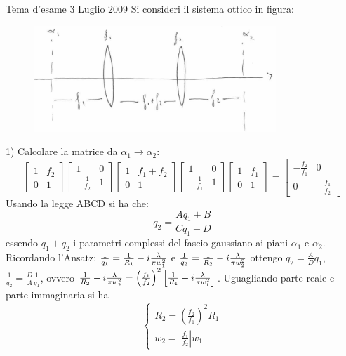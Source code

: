 Tema d'esame 3 Luglio 2009
Si consideri il sistema ottico in figura:
\begin{figure}[H]
\centering
\includegraphics[height=4cm]{images/7}
\end{figure}
1) Calcolare la matrice da $\alpha_1 \rightarrow \alpha_2$:
\begin{equation*}
\begin{bmatrix}
1	&	f_2\\
0	&	1
\end{bmatrix}
\begin{bmatrix}
1	&	0\\
-\frac{1}{f_2}	&	1
\end{bmatrix}
\begin{bmatrix}
1	&	f_1 + f_2\\
0	&	1
\end{bmatrix}
\begin{bmatrix}
1	&	0\\
-\frac{1}{f_1}	&	1
\end{bmatrix}
\begin{bmatrix}
1	&	f_1\\
0	&	1
\end{bmatrix}
=
\begin{bmatrix}
-\frac{f_2}{f_1}	&	0\\
0	&	- \frac{f_1}{f_2}
\end{bmatrix}
\end{equation*}
Usando la legge ABCD si ha che:
\begin{equation*}
q_2 = \frac{Aq_1 + B}{Cq_1 + D}
\end{equation*}
essendo $q_1 + q_2$ i parametri complessi del fascio gaussiano ai piani $\alpha_1$ e $\alpha_2$.
Ricordando l'Ansatz:
$\frac{1}{q_1} = \frac{1}{R_1} -i\frac{\lambda}{\pi w_1^2}$ e $\frac{1}{q_2} = \frac{1}{R_2} -i\frac{\lambda}{\pi w_2^2}$ ottengo $q_2 = \frac{A}{D}q_1$, $\frac{1}{q_2} = \frac{D}{A}\frac{1}{q_1}$, ovvero $\frac{1}{R_2} -i\frac{\lambda}{\pi w_2^2} = \left(\frac{f_1}{f_2}\right)^2 \left[\frac{1}{R_1} - i\frac{\lambda}{\pi w_1^2}\right]$.
Uguagliando parte reale e parte immaginaria si ha
\begin{equation*}
\begin{cases}
R_2 = \left(\frac{f_2}{f_1}\right)^2 R_1\\
w_2 = \left|\frac{f_1}{f_2}\right|w_1
\end{cases}
\end{equation*}